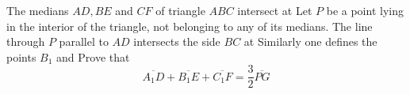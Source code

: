 The medians $AD, BE$ and $CF$ of triangle $ABC$ intersect at  Let $P$ be a point lying in the interior of the triangle, not belonging to any of its medians. The line through $P$ parallel to $AD$ intersects the side $BC$ at  Similarly one defines the points $B_{1}$ and  Prove that
\[ \overline{A_{1}D}+\overline{B_{1}E}+\overline{C_{1}F}=\frac{3}{2}\overline{PG} \]